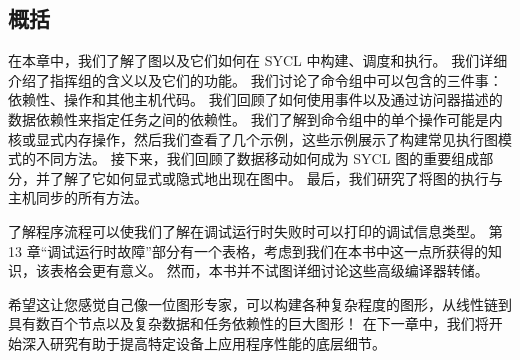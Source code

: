 \subsection{概括}
在本章中，我们了解了图以及它们如何在 SYCL 中构建、调度和执行。 我们详细介绍了指挥组的含义以及它们的功能。 我们讨论了命令组中可以包含的三件事：依赖性、操作和其他主机代码。 我们回顾了如何使用事件以及通过访问器描述的数据依赖性来指定任务之间的依赖性。 我们了解到命令组中的单个操作可能是内核或显式内存操作，然后我们查看了几个示例，这些示例展示了构建常见执行图模式的不同方法。 接下来，我们回顾了数据移动如何成为 SYCL 图的重要组成部分，并了解了它如何显式或隐式地出现在图中。 最后，我们研究了将图的执行与主机同步的所有方法。

了解程序流程可以使我们了解在调试运行时失败时可以打印的调试信息类型。 第 13 章“调试运行时故障”部分有一个表格，考虑到我们在本书中这一点所获得的知识，该表格会更有意义。 然而，本书并不试图详细讨论这些高级编译器转储。

希望这让您感觉自己像一位图形专家，可以构建各种复杂程度的图形，从线性链到具有数百个节点以及复杂数据和任务依赖性的巨大图形！ 在下一章中，我们将开始深入研究有助于提高特定设备上应用程序性能的底层细节。